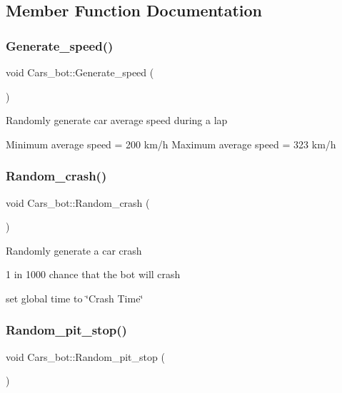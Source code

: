 \subsection{Member Function Documentation}
\mbox{\label{class_cars__bot_a79d7a174260eb5c633b3067dbdef04e5}} 
\subsubsection{\texorpdfstring{Generate\+\_\+speed()}{Generate\_speed()}}
{\footnotesize\ttfamily void Cars\+\_\+bot\+::\+Generate\+\_\+speed (\begin{DoxyParamCaption}{ }\end{DoxyParamCaption})}

Randomly generate car average speed during a lap

Minimum average speed = 200 km/h Maximum average speed = 323 km/h \mbox{\label{class_cars__bot_ab7d72e0c79e5efd16a0242c950e0dbf8}} 
\subsubsection{\texorpdfstring{Random\+\_\+crash()}{Random\_crash()}}
{\footnotesize\ttfamily void Cars\+\_\+bot\+::\+Random\+\_\+crash (\begin{DoxyParamCaption}{ }\end{DoxyParamCaption})}

Randomly generate a car crash

1 in 1000 chance that the bot will crash

set global time to \char`\"{}\+Crash Time\char`\"{} \mbox{\label{class_cars__bot_a16a23b35ae128f5b905c0d95f56f916e}} 
\subsubsection{\texorpdfstring{Random\+\_\+pit\+\_\+stop()}{Random\_pit\_stop()}}
{\footnotesize\ttfamily void Cars\+\_\+bot\+::\+Random\+\_\+pit\+\_\+stop (\begin{DoxyParamCaption}{ }\end{DoxyParamCaption})}

